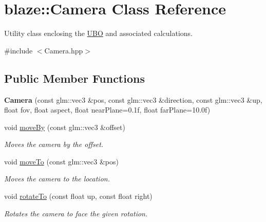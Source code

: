 \hypertarget{classblaze_1_1Camera}{}\section{blaze\+:\+:Camera Class Reference}
\label{classblaze_1_1Camera}


Utility class enclosing the \hyperlink{classblaze_1_1UBO}{U\+BO} and associated calculations.  




{\ttfamily \#include $<$Camera.\+hpp$>$}

\subsection*{Public Member Functions}
\begin{DoxyCompactItemize}
\item 
\mbox{\label{classblaze_1_1Camera_a83214846a28d6c1fee5a533c6e7471b0}} 
{\bfseries Camera} (const glm\+::vec3 \&pos, const glm\+::vec3 \&direction, const glm\+::vec3 \&up, float fov, float aspect, float near\+Plane=0.\+1f, float far\+Plane=10.\+0f)
\item 
\mbox{\label{classblaze_1_1Camera_ae3c12fec0a57dbd4e885877c7d08288d}} 
void \hyperlink{classblaze_1_1Camera_ae3c12fec0a57dbd4e885877c7d08288d}{move\+By} (const glm\+::vec3 \&offset)
\begin{DoxyCompactList}\small\item\em Moves the camera by the offset. \end{DoxyCompactList}\item 
\mbox{\label{classblaze_1_1Camera_ab00e3155208d945896c0b5a415921ec1}} 
void \hyperlink{classblaze_1_1Camera_ab00e3155208d945896c0b5a415921ec1}{move\+To} (const glm\+::vec3 \&pos)
\begin{DoxyCompactList}\small\item\em Moves the camera to the location. \end{DoxyCompactList}\item 
void \hyperlink{classblaze_1_1Camera_ac8fe17f6fc1abadcfa7ec86bee4152d5}{rotate\+To} (const float up, const float right)
\begin{DoxyCompactList}\small\item\em Rotates the camera to face the given rotation. \end{DoxyCompactList}\item 

\end{DoxyCompactItemize}
